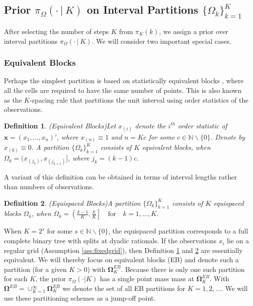 \documentclass{article}
\newcommand{\1}{\mathbb{I}}
\newcommand{\N}{\mathbb{N}}
\newcommand{\bm}[1]{\boldsymbol{#1}}
\def\C {\,|\:}
\def\C {\,|\:}
\def\x{\bm{x}}
\newtheorem{definition}{Definition}[section]
\theoremstyle{assumption}
\begin{document}
\subsection{Prior  $\pi_{\Omega}(\cdot\C K)$ on Interval Partitions $\{\Omega_k\}_{k=1}^K$ }
After selecting the number of steps $K$ from $\pi_K(k)$, we  assign a prior over interval partitions $\pi_{\Omega}(\cdot\C K)$.
We will consider two important special cases.

\subsubsection{Equivalent Blocks}\label{sec:EB}
Perhaps the simplest  partition is based on statistically equivalent blocks \cite{anderson}, where all the cells are required to have the same number of points. This is also known as the $K$-spacing rule that partitions the unit interval using order statistics of the observations. 

\begin{definition}(Equivalent Blocks)\label{prior_EB}
Let $x_{(i)}$ denote the $i^{th}$ order statistic of $\x=(x_1,\dots,x_n)'$, where $x_{(n)}\equiv 1$ and $n=Kc$ for some $c\in\mathbb{N}\backslash\{0\}$. Denote by $x_{(0)}\equiv 0$. 
A partition $\{\Omega_k\}_{k=1}^K$ consists of $K$ equivalent blocks, when
$\Omega_k=(x_{(j_k)},x_{(j_{k+1})}]$, where $j_k=(k-1)c$.
\end{definition}
A variant of this definition can be obtained in terms of interval lengths rather than numbers of observations. 
\begin{definition}(Equispaced Blocks)\label{prior_EB2}
A partition $\{\Omega_k\}_{k=1}^K$ consists of $K$ {\sl equispaced blocks} $\Omega_k$, when
$
\Omega_k = \left(\frac{k-1}{K}, \frac{k}{K}\right]\quad\text{for}\quad k=1,\dots, K.
$\end{definition}
 When $K=2^s$ for some $s\in\N\backslash\{0\}$, the equispaced partition corresponds to a  full complete binary tree with splits at dyadic rationals. 
If the observations $x_i$ lie on a regular grid (Assumption \ref{ass:fixedgrid}), then Definition \ref{prior_EB} and \ref{prior_EB2} are essentially equivalent. We will thereby focus on equivalent blocks (EB) and denote such a partition  (for a given $K>0$) with $\bm{\Omega}_K^{EB}$. Because there is only one such partition for each $K$, the prior $\pi_{\Omega}(\cdot| K)$ has a single point mass mass at $\bm{\Omega}_K^{EB}$.
With $\bm{\Omega}^{EB}=\cup_{K=1}^\infty\bm{\Omega}_K^{EB}$ we denote the set of all EB partitions for $K=1,2,\dots$. We will use these partitioning schemes as a jump-off point.
\end{document}
